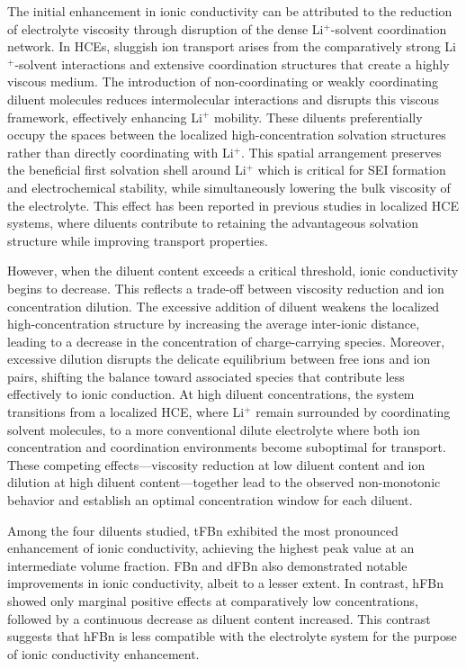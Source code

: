 \documentclass[11pt, a4paper]{article}
\begin{document}
The initial enhancement in ionic conductivity can be attributed to the reduction of electrolyte viscosity through disruption of the dense Li$^+$-solvent coordination network. In HCEs, sluggish ion transport arises from the comparatively strong Li$^+$-solvent interactions and extensive coordination structures that create a highly viscous medium. The introduction of non-coordinating or weakly coordinating diluent molecules reduces intermolecular interactions and disrupts this viscous framework, effectively enhancing Li$^+$ mobility. These diluents preferentially occupy the spaces between the localized high-concentration solvation structures rather than directly coordinating with Li$^+$. This spatial arrangement preserves the beneficial first solvation shell around Li$^+$ which is critical for SEI formation and electrochemical stability, while simultaneously lowering the bulk viscosity of the electrolyte. This effect has been reported in previous studies in localized HCE systems, where diluents contribute to retaining the advantageous solvation structure while improving transport properties\cite{ref.8}\cite{ref.9}.

However, when the diluent content exceeds a critical threshold, ionic conductivity begins to decrease. This reflects a trade-off between viscosity reduction and ion concentration dilution. The excessive addition of diluent weakens the localized high-concentration structure by increasing the average inter-ionic distance, leading to a decrease in the concentration of charge-carrying species. Moreover, excessive dilution disrupts the delicate equilibrium between free ions and ion pairs, shifting the balance toward associated species that contribute less effectively to ionic conduction. At high diluent concentrations, the system transitions from a localized HCE, where Li$^+$ remain surrounded by coordinating solvent molecules, to a more conventional dilute electrolyte where both ion concentration and coordination environments become suboptimal for transport. These competing effects—viscosity reduction at low diluent content and ion dilution at high diluent content—together lead to the observed non-monotonic behavior and establish an optimal concentration window for each diluent\cite{ref.11}.

Among the four diluents studied, tFBn exhibited the most pronounced enhancement of ionic conductivity, achieving the highest peak value at an intermediate volume fraction. FBn and dFBn also demonstrated notable improvements in ionic conductivity, albeit to a lesser extent. In contrast, hFBn showed only marginal positive effects at comparatively low concentrations, followed by a continuous decrease as diluent content increased. This contrast suggests that hFBn is less compatible with the electrolyte system for the purpose of ionic conductivity enhancement.
\end{document}
